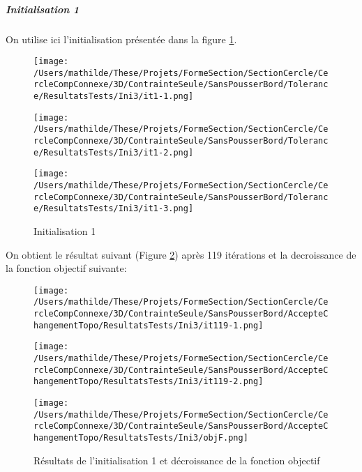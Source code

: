 \documentclass[11pt,a4paper]{article}
\begin{document}
\subparagraph{Initialisation 1} On utilise ici l'initialisation présentée dans la figure \ref{fig:cercleseul3Daini1}.

\begin{figure}[H]
	\label{fig:cercleseul3Daini1}
	\begin{minipage}{0.32\textwidth}
		\centering
		\texttt{[image: /Users/mathilde/These/Projets/FormeSection/SectionCercle/CercleCompConnexe/3D/ContrainteSeule/SansPousserBord/Tolerance/ResultatsTests/Ini3/it1-1.png]}
	\end{minipage}
	\begin{minipage}{0.32\textwidth}
		\centering
		\texttt{[image: /Users/mathilde/These/Projets/FormeSection/SectionCercle/CercleCompConnexe/3D/ContrainteSeule/SansPousserBord/Tolerance/ResultatsTests/Ini3/it1-2.png]}
	\end{minipage}
	\begin{minipage}{0.32\textwidth}
		\centering
		\texttt{[image: /Users/mathilde/These/Projets/FormeSection/SectionCercle/CercleCompConnexe/3D/ContrainteSeule/SansPousserBord/Tolerance/ResultatsTests/Ini3/it1-3.png]}
	\end{minipage}	
	\caption{Initialisation 1}	
\end{figure}

On obtient le résultat suivant (Figure \ref{fig:cercleseul3Dsini1Fin}) après 119 itérations et la decroissance de la fonction objectif suivante:

\begin{figure}[H]
	\label{fig:cercleseul3Dsini1Fin}
	\begin{minipage}{0.33\textwidth}
		\centering
		\texttt{[image: /Users/mathilde/These/Projets/FormeSection/SectionCercle/CercleCompConnexe/3D/ContrainteSeule/SansPousserBord/AccepteChangementTopo/ResultatsTests/Ini3/it119-1.png]}
	\end{minipage}
	\begin{minipage}{0.33\textwidth}
		\centering
		\texttt{[image: /Users/mathilde/These/Projets/FormeSection/SectionCercle/CercleCompConnexe/3D/ContrainteSeule/SansPousserBord/AccepteChangementTopo/ResultatsTests/Ini3/it119-2.png]}
	\end{minipage}	
	\begin{minipage}{0.33\textwidth}
		\centering
		\texttt{[image: /Users/mathilde/These/Projets/FormeSection/SectionCercle/CercleCompConnexe/3D/ContrainteSeule/SansPousserBord/AccepteChangementTopo/ResultatsTests/Ini3/objF.png]}
	\end{minipage}	
	\caption{Résultats de l'initialisation 1 et décroissance de la fonction objectif}	
\end{figure}
\end{document}
